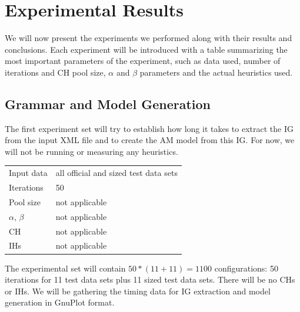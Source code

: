 \section{Experimental Results}

We will now present the experiments we performed along with their results and conclusions. Each experiment will be introduced with a table summarizing the most important parameters of the experiment, such as data used, number of iterations and CH pool size, $\alpha$ and $\beta$ parameters and the actual heuristics used.

\subsection{Grammar and Model Generation}
\label{section-grammar-model-timing}


The first experiment set will try to establish how long it takes to extract the IG from the input XML file and to create the AM model from this IG. For now, we will not be running or measuring any heuristics.

\begin{center}
\bigskip
\begin{tabular}{| l | l |}
  \hline
  \hline
  Input data        & all official and sized test data sets \\
  Iterations        & 50 \\
  Pool size         & not applicable \\
  $\alpha$, $\beta$ & not applicable \\
  CH                & not applicable \\
  IHs               & not applicable \\
  \hline
\end{tabular}
\bigskip
\end{center}

The experimental set will contain $50 * (11 + 11) = 1100$ configurations: 50 iterations for 11 test data sets plus 11 sized test data sets. There will be no CHs or IHs. We will be gathering the timing data for IG extraction and model generation in GnuPlot format.\\

